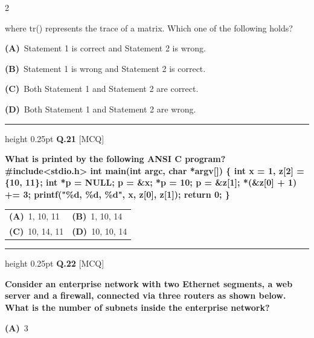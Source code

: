 \documentclass[a4paper,10pt,twoside]{article}
\begin{document}
\begin{multicols}{2}
{where tr() represents the trace of a matrix. Which one of the following holds? \par}
\par\vspace{2pt}\noindent
\textbf{(A)}~Statement 1 is correct and Statement 2 is wrong.\par\vspace{2pt}\noindent
\textbf{(B)}~Statement 1 is wrong and Statement 2 is correct.\par\vspace{2pt}\noindent
\textbf{(C)}~Both Statement 1 and Statement 2 are correct.\par\vspace{2pt}\noindent
\textbf{(D)}~Both Statement 1 and Statement 2 are wrong.
\par\vspace{6pt}\hrule height 0.25pt\vspace{6pt}
\noindent\textbf{Q.21} \hfill {\footnotesize\textsf{[MCQ]}}
\par\vspace{2pt}
{\bfseries What is printed by the following ANSI C program?
\#include<stdio.h>
int main(int argc, char *argv[])
\{
int x = 1, z[2] = \{10, 11\};
int *p = NULL;
p = \&x;
*p = 10;
p = \&z[1];
*(\&z[0] + 1) += 3;
printf("\%d, \%d, \%d\n", x, z[0], z[1]);
return 0;
\} \par}
\par\vspace{2pt}\noindent
\begin{tabular*}{\columnwidth}{@{\extracolsep{\fill}}p{}p{}@{}}
\textbf{(A)}~1, 10, 11 & \textbf{(B)}~1, 10, 14 \\
\addlinespace[2pt]
\textbf{(C)}~10, 14, 11 & \textbf{(D)}~10, 10, 14
\end{tabular*}
\par\vspace{6pt}\hrule height 0.25pt\vspace{6pt}
\noindent\textbf{Q.22} \hfill {\footnotesize\textsf{[MCQ]}}
\par\vspace{2pt}
{\bfseries Consider an enterprise network with two Ethernet segments, a web server and a
firewall, connected via three routers as shown below.
What is the number of subnets inside the enterprise network? \par}
\par\vspace{2pt}\noindent
\textbf{(A)}~3\par\vspace{2pt}\noindent

\end{multicols}
\end{document}
